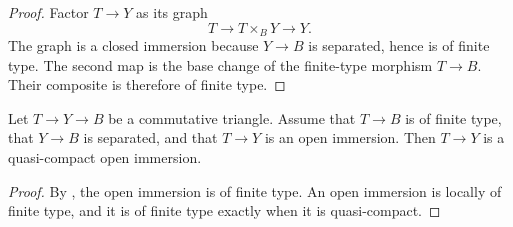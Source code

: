 \begin{proof}
  Factor \(T\to Y\) as its graph
  \[
    T\longrightarrow T\times_BY\longrightarrow Y.
  \]
  The graph is a closed immersion because \(Y\to B\) is separated, hence is
  of finite type.  The second map is the base change of the finite-type
  morphism \(T\to B\).  Their composite is therefore of finite type.
\end{proof}

\begin{lemma}
  \label{lemma:nagata-open-immersion-qc-over-separated-target}

  Let \(T\to Y\to B\) be a commutative triangle.  Assume that \(T\to B\) is
  of finite type, that \(Y\to B\) is separated, and that \(T\to Y\) is an
  open immersion.  Then \(T\to Y\) is a quasi-compact open immersion.
\end{lemma}

\begin{proof}
  By , the open immersion
  is of finite type.  An open immersion is locally of finite type, and it is
  of finite type exactly when it is quasi-compact.
\end{proof}

